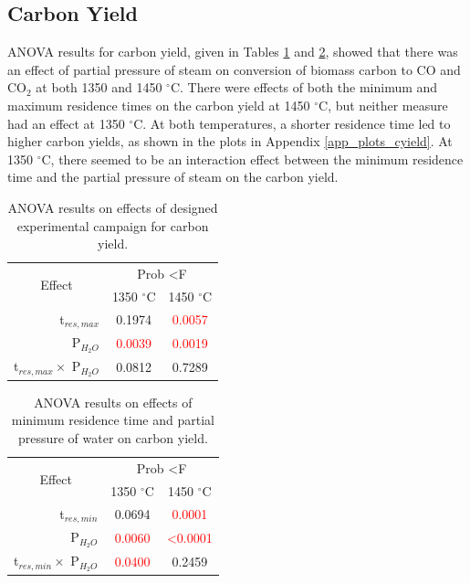 \documentclass[11pt,twocolumn]{article}
\begin{document}
\subsection*{Carbon Yield}

ANOVA results for carbon yield, given in Tables \ref{anova_cyield} and \ref{anova_cyield_tmin}, showed that there was an effect of partial pressure of steam on conversion of biomass carbon to CO and CO$_2$ at both 1350 and 1450 $^\circ$C.  There were effects of both the minimum and maximum residence times on the carbon yield at 1450 $^\circ$C, but neither measure had an effect at 1350 $^\circ$C.  At both temperatures, a shorter residence time led to higher carbon yields, as shown in the plots in Appendix \ref{app_plots_cyield}. At 1350 $^\circ$C, there seemed to be an interaction effect between the minimum residence time and the partial pressure of steam on the carbon yield.

\begin{table}
	\centering
	\caption{ANOVA results on effects of designed experimental campaign for carbon yield.}
	\begin{tabular}{r c c}
		\toprule
		\multicolumn{1}{c}{\multirow{2}{*}{Effect}}		& 	\multicolumn{2}{c}{Prob \textless F	}	\\
		{}								&	1350 $^\circ$C					&	1450 $^\circ$C			\\
		\midrule
		t$_{res,max}$						&	0.1974						&	\textcolor{red}{0.0057}	\\
		P$_{H_2O}$						&	\textcolor{red}{0.0039}			&	\textcolor{red}{0.0019}	\\
		t$_{res,max}\times$ P$_{H_2O}$		&	0.0812						&	0.7289				\\
		\bottomrule
	\end{tabular}
	\label{anova_cyield}
\end{table}

\begin{table}
	\centering
	\caption{ANOVA results on effects of minimum residence time and partial pressure of water on carbon yield.}
	\begin{tabular}{r c c}
		\toprule
		\multicolumn{1}{c}{\multirow{2}{*}{Effect}}		& 	\multicolumn{2}{c}{Prob \textless F	}	\\
		{}								&	1350 $^\circ$C					&	1450 $^\circ$C			\\
		\midrule
		t$_{res,min}$						&	0.0694						&	\textcolor{red}{0.0001}	\\
		P$_{H_2O}$						&	\textcolor{red}{0.0060}			&	\textcolor{red}{\textless 0.0001}	\\
		t$_{res,min}\times$ P$_{H_2O}$		&	\textcolor{red}{0.0400}			&	0.2459				\\
		\bottomrule
	\end{tabular}
	\label{anova_cyield_tmin}
\end{table}
\end{document}
